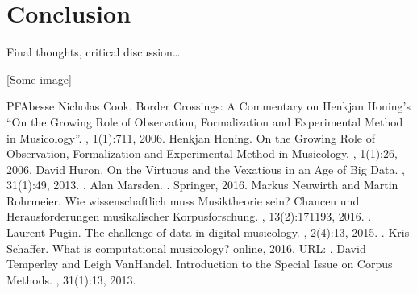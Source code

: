 \documentclass[letterpaper,10pt,english]{sphinxmanual}
\begin{document}
\chapter{Conclusion}
\label{\detokenize{conclusion:conclusion}}\label{\detokenize{conclusion::doc}}
Final thoughts, critical discussion…

{[}Some image{]}



\begin{sphinxthebibliography}{PFAbesse}
Nicholas Cook. Border Crossings: A Commentary on Henkjan Honing’s “On the Growing Role of Observation, Formalization and Experimental Method in Musicology”. , 1(1):7\textendash{}11, 2006.
Henkjan Honing. On the Growing Role of Observation, Formalization and Experimental Method in Musicology. , 1(1):2\textendash{}6, 2006.
David Huron. On the Virtuous and the Vexatious in an Age of Big Data. , 31(1):4\textendash{}9, 2013. .
Alan Marsden. . Springer, 2016.
Markus Neuwirth and Martin Rohrmeier. Wie wissenschaftlich muss Musiktheorie sein? Chancen und Herausforderungen musikalischer Korpusforschung. , 13(2):171\textendash{}193, 2016. .
Laurent Pugin. The challenge of data in digital musicology. , 2(4):1\textendash{}3, 2015. .
Kris Schaffer. What is computational musicology? online, 2016. URL: .
David Temperley and Leigh VanHandel. Introduction to the Special Issue on Corpus Methods. , 31(1):1\textendash{}3, 2013.

\end{sphinxthebibliography}
\end{document}
